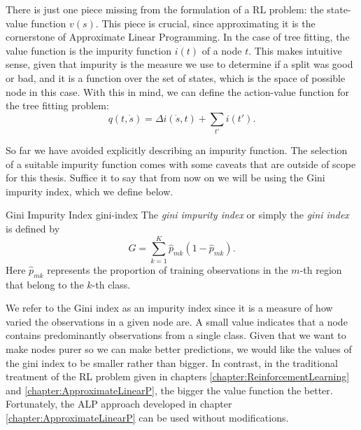 There is just one piece missing from the formulation of a RL problem: the state-value function $v(s)$. This piece is crucial, since approximating it is the cornerstone of Approximate Linear Programming. In the case of tree fitting, the value function is the impurity function $i(t)$ of a node $t$. This makes intuitive sense, given that impurity is the measure we use to determine if a split was good or bad, and it is a function over the set of states, which is the space of possible node in this case. With this in mind, we can define the action-value function for the tree fitting problem:
\begin{equation}
    q (t, \dot{s}) = \Delta i(\dot{s}, t) + \sum_{t'} i (t').
\end{equation}

So far we have avoided explicitly describing an impurity function. The selection of a suitable impurity function comes with some caveats that are outside of scope for this thesis. Suffice it to say that from now on we will be using the Gini impurity index, which we define below.

\begin{dfn}{Gini Impurity Index \cite[Ch.~8.1.2]{intro2statslearning} }{gini-index}
    The \emph{gini impurity index} or simply the \emph{gini index} is defined by
    \begin{equation}
        G = \sum_{k=1}^{K} \widehat{p}_{mk}(1 - \widehat{p}_{mk}).
    \end{equation}
    Here $\widehat{p}_{mk}$ represents the proportion of training observations in the $m$-th region that belong to the $k$-th class.
\end{dfn}

We refer to the Gini index as an impurity index since it is a measure of how
varied the observations in a given node are. A small value indicates that a node
contains predominantly observations from a single class. Given that we want to
make nodes purer so we can make better predictions, we would like the values of
the gini index to be smaller rather than bigger. In contrast, in the traditional
treatment of the RL problem given in chapters
\ref{chapter:ReinforcementLearning} and \ref{chapter:ApproximateLinearP}, the
bigger the value function the better. Fortunately, the ALP approach developed in
chapter \ref{chapter:ApproximateLinearP} can be used without modifications.


